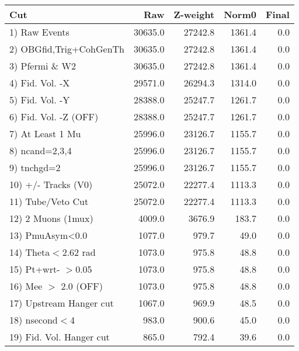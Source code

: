  \begin{table}[h!]\centering
 \begin{tabular}{||l||r|r|r|r||}
 \hline
 \hline
 Cut & Raw & Z-weight & Norm0 & Final \\
 \hline
  1) Raw Events           &     30635.0 &     27242.8 &      1361.4 &         0.0 \\
  2) OBGfid,Trig+CohGenTh &     30635.0 &     27242.8 &      1361.4 &         0.0 \\
  3) Pfermi \& W2         &     30635.0 &     27242.8 &      1361.4 &         0.0 \\
  4) Fid. Vol. -X         &     29571.0 &     26294.3 &      1314.0 &         0.0 \\
  5) Fid. Vol. -Y         &     28388.0 &     25247.7 &      1261.7 &         0.0 \\
  6) Fid. Vol. -Z (OFF)   &     28388.0 &     25247.7 &      1261.7 &         0.0 \\
  7) At Least 1 Mu        &     25996.0 &     23126.7 &      1155.7 &         0.0 \\
  8) ncand=2,3,4          &     25996.0 &     23126.7 &      1155.7 &         0.0 \\
  9) tnchgd=2             &     25996.0 &     23126.7 &      1155.7 &         0.0 \\
 10) +/- Tracks (V0)      &     25072.0 &     22277.4 &      1113.3 &         0.0 \\
 11) Tube/Veto Cut        &     25072.0 &     22277.4 &      1113.3 &         0.0 \\
 12) 2 Muons (1mux)       &      4009.0 &      3676.9 &       183.7 &         0.0 \\
 13) PmuAsym<0.0          &      1077.0 &       979.7 &        49.0 &         0.0 \\
 14) Theta$<$2.62 rad     &      1073.0 &       975.8 &        48.8 &         0.0 \\
 15) Pt+wrt- $>$0.05      &      1073.0 &       975.8 &        48.8 &         0.0 \\
 16) Mee $>$ 2.0  (OFF)   &      1073.0 &       975.8 &        48.8 &         0.0 \\
 17) Upstream Hanger cut  &      1067.0 &       969.9 &        48.5 &         0.0 \\
 18) nsecond$<$4          &       983.0 &       900.6 &        45.0 &         0.0 \\
 19) Fid. Vol. Hanger cut &       865.0 &       792.4 &        39.6 &         0.0 \\

\end{tabular}
\end{table}

